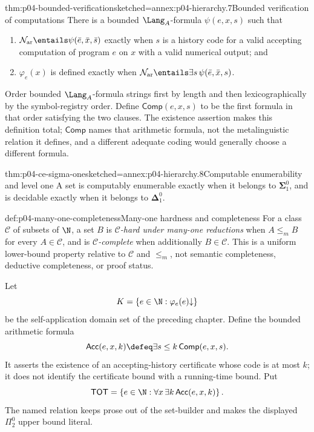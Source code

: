 \begin{hbtheorem}{thm:p04-bounded-verification}{sketched=annex:p04-hierarchy.7}{Bounded verification of computations}
There is a bounded \(\Lang_A\)-formula \(\psi(e,x,s)\) such that
\begin{enumerate}
 \item \(\mathcal N_{\mathrm{ar}}\entails\psi(\bar e,\bar x,\bar s)\) exactly
       when \(s\) is a history code for a valid accepting computation of
       program \(e\) on \(x\) with a valid numerical output; and
 \item \(\varphi_e(x)\) is defined exactly when
       \(\mathcal N_{\mathrm{ar}}\entails\exists s\,\psi(\bar e,\bar x,s)\).
\end{enumerate}
Order bounded \(\Lang_A\)-formula strings first by length and then
lexicographically by the symbol-registry order.  Define
\(\mathsf{Comp}(e,x,s)\) to be the first formula in that order satisfying the
two clauses.  The existence assertion makes this definition total;
\(\mathsf{Comp}\) names that arithmetic formula, not the metalinguistic
relation it defines, and a different adequate coding would generally choose a
different formula.
\end{hbtheorem}

\begin{hbtheorem}{thm:p04-ce-sigma-one}{sketched=annex:p04-hierarchy.8}{Computable enumerability and level one}
A set is computably enumerable exactly when it belongs to
\(\boldsymbol\Sigma^0_1\), and is decidable exactly when it belongs to
\(\boldsymbol\Delta^0_1\).
\end{hbtheorem}

\begin{hbdefinition}{def:p04-many-one-completeness}{Many-one hardness and completeness}
For a class \(\mathcal C\) of subsets of \(\N\), a set \(B\) is
\emph{\(\mathcal C\)-hard under many-one reductions} when
\(A\leq_m B\) for every \(A\in\mathcal C\), and is
\emph{\(\mathcal C\)-complete} when additionally \(B\in\mathcal C\).
This is a uniform lower-bound property relative to \(\mathcal C\) and
\(\leq_m\), not semantic completeness, deductive completeness, or proof
status.
\end{hbdefinition}

Let
\[
 K=\left\{e\in\N:\varphi_e(e)\mathord\downarrow\right\}
\]
be the self-application domain set of the preceding chapter.  Define the
bounded arithmetic formula
\[
 \mathsf{Acc}(e,x,k)\defeq
 \exists s\leq k\,\mathsf{Comp}(e,x,s).
\]
It asserts the existence of an accepting-history certificate whose code is at
most \(k\); it does not identify the certificate bound with a running-time
bound.  Put
\[
 \mathsf{TOT}=\left\{e\in\N:\forall x\,\exists k\,
                   \mathsf{Acc}(e,x,k)\right\}.
\]
The named relation keeps prose out of the set-builder and makes the displayed
\(\Pi^0_2\) upper bound literal.

